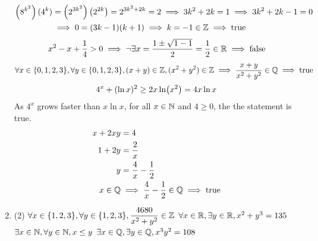 \documentclass[../MATH135.tex]{subfiles}
\begin{document}
\begin{enumerate}
				\begin{tasks}
					\task
						\begin{align*}
							\left(8^{k^2}\right)(4^k) &= \left(2^{3k^2}\right)\left(2^{2k}\right)
									= 2^{3k^2 + 2k}
									= 2
									\implies 3k^2 + 2k = 1
									\implies 3k^2 + 2k - 1 = 0 \\
								&\implies 0 = (3k - 1)(k + 1)
								\implies k = -1 \in \mathbb{Z}
								\implies \text{true}	
						\end{align*}
					\task
						\[
							x^2 - x + \frac{1}{4} > 0
								\implies \lnot\exists x = \frac{1 \pm \sqrt{1 - 1}}{2} = \frac{1}{2}\in \mathbb{R}
								\implies \text{false}
						\]
					\task
						\[
							\forall x \in \{0, 1, 2, 3\}, \forall y \in \{0, 1, 2, 3\}, 
								(x + y) \in \mathbb{Z}, 
								(x^2 + y^2) \in \mathbb{Z}
								\implies \frac{x + y}{x^2 + y^2} \in \mathbb{Q}
								\implies \text{true}
						\]
					\task
						\[
							4^x + (\ln x)^2 \ge 2x\ln(x^2)
								= 4x\ln x \\
						\]
						As \(4^x\) grows faster than \(x\ln x\), for all \(x \in \mathbb{N}\) and \(4 \ge 0\), the the statement is true.
					\task
						\begin{align*}
							x + 2xy &= 4 \\
							1 + 2y &= \frac{2}{x} \\
							y &= \frac{4}{x} - \frac{1}{2} \\
							x \in \mathbb{Q} &\implies \frac{4}{x} - \frac{1}{2} \in \mathbb{Q}
									\implies \text{true}
						\end{align*}
				\end{tasks}
			\item
				\begin{tasks}(2)
					\task
						\(\forall x \in \{1, 2, 3\}, \forall y \in \{1, 2, 3\}, \dfrac{4680}{x^2 + y^2} \in \mathbb{Z}\)
					\task
						\(\forall x \in \mathbb{R}, \exists y \in \mathbb{R}, x^2 + y^3 = 135\)
					\task
						\(\exists x \in \mathbb{N}, \forall y \in \mathbb{N}, x \le y\)
					\task
						\(\exists x \in \mathbb{Q}, \exists y \in \mathbb{Q}, x^3y^2 = 108\)
				\end{tasks}
		\end{enumerate}
\end{document}
